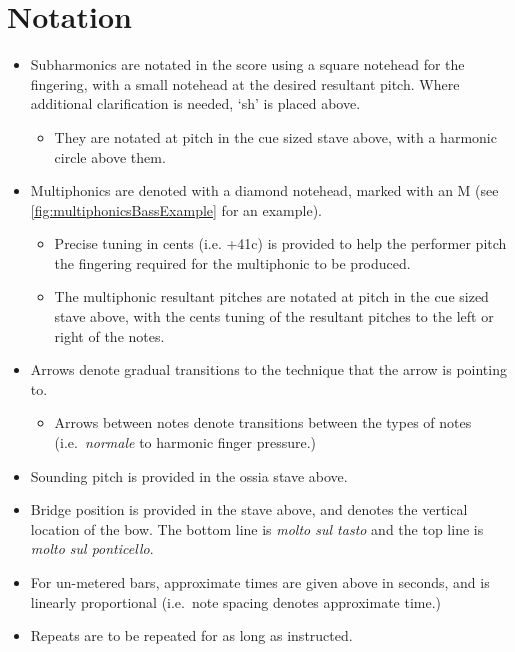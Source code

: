 \section*{Notation}
\begin{itemize}

    \item Subharmonics are notated in the score using a square notehead for the fingering, with a small notehead at the desired resultant pitch. Where additional clarification is needed, `sh' is placed above.
    \begin{itemize}
      \item They are notated at pitch in the cue sized stave above, with a harmonic circle above them.
    \end{itemize}
    \item Multiphonics are denoted with a diamond notehead, marked with an M (see \autoref{fig:multiphonicsBassExample} for an example). 
    \begin{itemize}
      \item Precise tuning in cents (i.e. +41c) is provided to help the performer pitch the fingering required for the multiphonic to be produced.
      \item The multiphonic resultant pitches are notated at pitch in the cue sized stave above, with the cents tuning of the resultant pitches to the left or right of the notes.
    \end{itemize}
    \item Arrows denote gradual transitions to the technique that the arrow is pointing to.\begin{itemize}
      \item Arrows between notes denote transitions between the types of notes (i.e.\ \emph{normale} to harmonic finger pressure.)
    \end{itemize}
    \item Sounding pitch is provided in the ossia stave above.
    \item Bridge position is provided in the stave above, and denotes the vertical location of the bow. The bottom line is \emph{molto sul tasto} and the top line is \emph{molto sul ponticello}.
    \item For un-metered bars, approximate times are given above in seconds, and is linearly proportional (i.e.\ note spacing denotes approximate time.)
    \item Repeats are to be repeated for as long as instructed.

\end{itemize}
